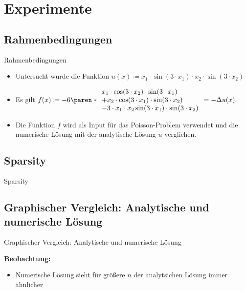 \documentclass[9pt, t]{beamer}
\begin{document}
\section{Experimente}
\subsection{Rahmenbedingungen}
\begin{frame}{Rahmenbedingungen}
    \begin{itemize}
        \item Untersucht wurde die Funktion \(u(x) \coloneq x_1 \cdot \sin(3
              \cdot x_1) \cdot x_2 \cdot \sin(3 \cdot x_2)\)
        \item Es gilt \(f(x) \coloneq -6 \paren*{
                  \begin{array}{l}
                      x_1 \cdot \cos(3 \cdot x_2) \cdot \sin(3 \cdot x_1)   \\
                      + x_2 \cdot \cos(3 \cdot x_1) \cdot \sin(3 \cdot x_2) \\
                      - 3 \cdot x_1 \cdot x_2 \sin(3 \cdot x_1) \cdot \sin(3 \cdot x_2)
                  \end{array}}
              = -\Delta u(x). \)
        \item Die Funktion \(f\) wird als Input für das Poisson-Problem
              verwendet und die numerische Lösung mit der analytische Lösung
              \(u\) verglichen.
    \end{itemize}

\end{frame}

\subsection{Sparsity}
\begin{frame}{Sparsity}


\end{frame}

\subsection{Graphischer Vergleich: Analytische und numerische Lösung}
\begin{frame}{Graphischer Vergleich: Analytische und numerische Lösung}


    \textbf{Beobachtung:}
    \begin{itemize}
        \item Numerische Lösung sieht für größere \(n\) der analytsichen Lösung
              immer ähnlicher
    \end{itemize}
\end{frame}
\end{document}
